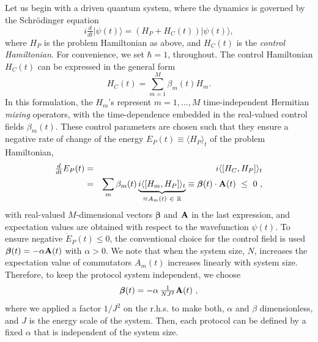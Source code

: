 \documentclass[twocolumn,aps,superscriptaddress,floatfix,longbibliography]{revtex4-2}
\newcommand{\be}{\begin{equation}}
\newcommand{\ee}{\end{equation}}
\begin{document}
Let us begin with a driven quantum system, where the dynamics
is governed by the Schr{\" o}dinger equation
\begin{equation}
    i\tfrac{d}{dt}|\psi(t)\rangle
  = \left(H_{P}+H_{C}(t)\right)|\psi(t)\rangle,
\label{Schrodinger}
\end{equation}
where $H_P$ is the problem Hamiltonian as above, and
$H_C(t)$ is the {\it control Hamiltonian}. For convenience, we
set $\hbar=1$, throughout. %
The control Hamiltonian $H_C(t)$ %
can be expressed in the general form
\begin{equation}
H_C(t)=\sum_{m=1}^{M} \beta_{m}(t)H_{m}.
    \label{ctrl-ham}
\end{equation}
In this formulation, the $H_m$'s represent $m=1,\ldots,M$ %
time-independent Hermitian {\it mixing} operators, 
with %
the time-dependence %
embedded in the
real-valued control fields $\beta_m(t)$. 
These control parameters are chosen such that they
ensure a negative rate of change of the %
energy $E_P(t) \equiv \langle H_P \rangle_t$
of the problem Hamiltonian, %
\begin{eqnarray}
   \tfrac{d}{dt}E_P(t)
 &=& i\langle [H_{C},H_{P}] \rangle _t
 \label{EP-dot} \\
 &=& \sum_{m}\beta_m(t) \underbrace{
   i\langle [H_{m},H_{P}] \rangle _t}_{\equiv A_m(t) \ \in\ \mathbb{R}}
   \equiv \boldsymbol{\beta}(t) \cdot {\bf A}(t)
 \ \leq\ 0
\text{ ,}\notag
\end{eqnarray}
with real-valued $M$-dimensional vectors $\boldsymbol{\beta}$ and $\bf A$
in the last expression, and expectation values are obtained
with respect to the wavefunction $\psi(t)$.
To ensure negative
$\dot{E}_P(t) \leq 0$, the conventional choice for the control field is used
$\boldsymbol{\beta}(t) = - \alpha {\bf A}(t)$
with $\alpha>0$. We note that when the system size, $N$, increases the expectation value of commutators $A_{m}(t)$ increases linearly with system size. Therefore, to keep the protocol system independent, we choose 
\be
     \boldsymbol{\beta}(t)
  = -\alpha \,  \tfrac{1}{NJ^2} {\bf A}(t)
\text{ ,}\label{alpha}
\ee
where we applied a factor $1/J^2$
on the r.h.s. to make both, $\alpha$ and $\beta$ dimensionless, and $J$ is the energy scale of the system.
Then, each protocol can be defined by a fixed $\alpha$ that is
independent of the system size.
\end{document}
